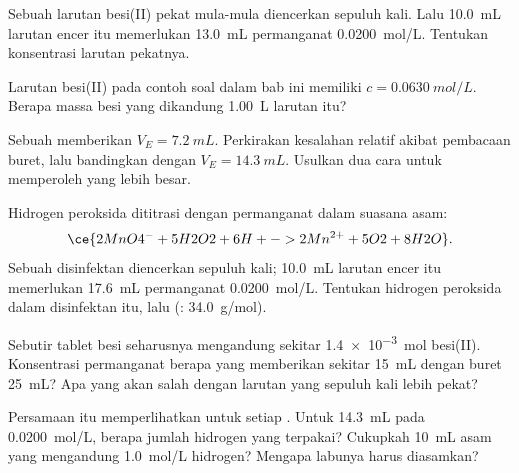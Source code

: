 \begin{exercise}[$\star\star$]\label{exo:g11:titration:10}
Sebuah larutan besi(II) pekat mula-mula diencerkan sepuluh kali. Lalu
\qty{10.0}{mL} larutan encer itu memerlukan \qty{13.0}{mL} permanganat
\qty{0.0200}{mol/L}. Tentukan konsentrasi larutan pekatnya.
\end{exercise}

\begin{exercise}[$\star\star$]\label{exo:g11:titration:11}
Larutan besi(II) pada contoh soal dalam bab ini memiliki
$c = \qty{0.0630}{mol/L}$. Berapa massa besi yang dikandung \qty{1.00}{L}
larutan itu?
\end{exercise}

\begin{exercise}[$\star\star\star$]\label{exo:g11:titration:12}
Sebuah  memberikan $V_E = \qty{7.2}{mL}$. Perkirakan kesalahan
relatif akibat pembacaan buret, lalu bandingkan dengan
$V_E = \qty{14.3}{mL}$. Usulkan dua cara untuk memperoleh  yang lebih besar.
\end{exercise}

\begin{exercise}[$\star\star\star$]\label{exo:g11:titration:13}
Hidrogen peroksida dititrasi dengan permanganat dalam suasana asam:
\[
  \ce{2MnO4^- + 5H2O2 + 6H+ -> 2Mn^{2+} + 5O2 + 8H2O} .
\]
Sebuah disinfektan diencerkan sepuluh kali; \qty{10.0}{mL} larutan encer
itu memerlukan \qty{17.6}{mL} permanganat \qty{0.0200}{mol/L}. Tentukan
 hidrogen peroksida dalam disinfektan itu, lalu
 (: \qty{34.0}{g/mol}).
\end{exercise}

\begin{exercise}[$\star\star\star$]\label{exo:g11:titration:14}
Sebutir tablet besi seharusnya mengandung sekitar \qty{1.4e-3}{mol}
besi(II). Konsentrasi permanganat berapa yang memberikan  sekitar \qty{15}{mL} dengan buret \qty{25}{mL}? Apa yang akan
salah dengan larutan yang sepuluh kali lebih pekat?
\end{exercise}

\begin{exercise}[$\star\star\star$]\label{exo:g11:titration:15}
Persamaan  itu memperlihatkan  untuk setiap .
Untuk  \qty{14.3}{mL} pada \qty{0.0200}{mol/L}, berapa
jumlah  hidrogen yang terpakai? Cukupkah \qty{10}{mL} asam yang
mengandung \qty{1.0}{mol/L}  hidrogen? Mengapa labunya harus
diasamkan?
\end{exercise}

